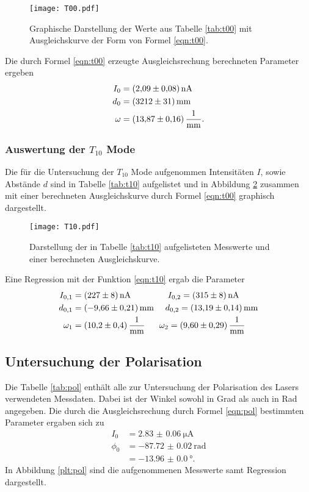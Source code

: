

\begin{figure}[htb]
  \centering
  \texttt{[image: T00.pdf]}
  \caption{Graphische Darstellung der Werte aus Tabelle \ref{tab:t00} mit Ausgleichskurve der Form von Formel \ref{eqn:t00}.}
  \label{plt:t00}
\end{figure}

Die durch Formel \ref{eqn:t00} erzeugte Ausgleichsrechung berechneten Parameter
ergeben
\begin{align*}
  I_0 &= \SI{2.09(8)}{\nano\ampere} \\
  d_0 &= \SI{3212(31)}{\milli\meter} \\
  \omega &= \SI{13.87(16)}{\raiseto{-1}\milli\meter}.
\end{align*}
\FloatBarrier

\subsubsection{Auswertung der $T_{10}$ Mode}

Die für die Untersuchung der $T_{10}$ Mode aufgenommen Intensitäten $I$,
sowie Abstände $d$ sind in Tabelle \ref{tab:t10} aufgelistet und in
Abbildung \ref{plt:t10} zusammen mit einer berechneten Ausgleichskurve durch
Formel \ref{eqn:t00} graphisch dargestellt.



\begin{figure}[htb]
  \centering
  \texttt{[image: T10.pdf]}
  \caption{Darstellung der in Tabelle \ref{tab:t10} aufgelisteten Messwerte und einer berechneten Ausgleichskurve.}
  \label{plt:t10}
\end{figure}

Eine Regression mit der Funktion \ref{eqn:t10} ergab die Parameter
\begin{align*}
  I_{0,1} &= \SI{227(8)}{\nano\ampere} \ \ \ \ \ \ \ \ \ \ \ \ \ I_{0,2} = \SI{315(8)}{\nano\ampere} \\
  d_{0,1} &= \SI{-9.66(21)}{\milli\meter} \ \ \ \ d_{0,2} = \SI{13.19(14)}{\milli\meter} \\
  \omega_1 &= \SI{10.2(4)}{\raiseto{-1}\milli\meter} \ \ \ \ \ \omega_2 = \SI{9.60(29)}{\raiseto{-1}\milli\meter}
\end{align*}
\FloatBarrier

\subsection{Untersuchung der Polarisation}
Die Tabelle \ref{tab:pol} enthält alle zur Untersuchung der Polarisation
des Lasers verwendeten Messdaten. Dabei ist der Winkel sowohl in Grad als
auch in Rad angegeben.
Die durch die Ausgleichsrechung durch Formel \ref{eqn:pol}
bestimmten Parameter ergaben sich zu
\begin{align*}
  I_0 &= \SI{2.83(6)}{\micro\ampere} \\
  \phi_0 &= \SI{-87.72(2)}{\radian} \\
      &= \SI{-13.96(0)}{\degree}.
\end{align*}
In Abbildung \ref{plt:pol} sind die aufgenommenen Messwerte samt Regression
dargestellt.

